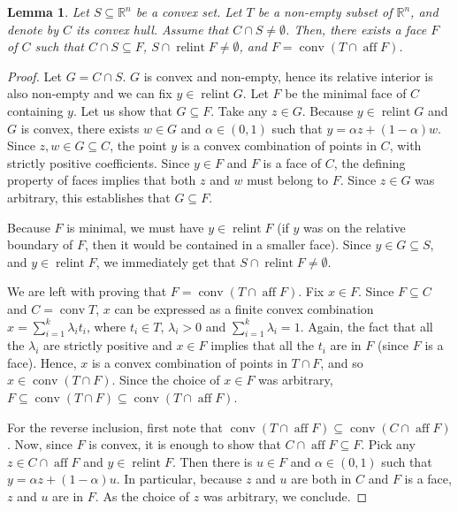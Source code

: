 \documentclass[10pt, a4paper]{article}
\newcommand{\R}{\mathbb R}
\DeclareMathOperator{\aff}{aff}
\DeclareMathOperator{\conv}{conv}
\DeclareMathOperator{\relint}{relint}
\newtheorem{lemma}{Lemma}
\begin{document}
\begin{lemma}\label{lemma:face}
    Let $S\subseteq\R^n$ be a  convex set. Let $T$ be a  non-empty subset of $\R^n$, and denote by $C$ its convex hull. Assume that $C\cap S\neq \emptyset$. Then, there exists a face $F$ of $C$ such that $C\cap S\subseteq F$, $S\cap \relint F \neq\emptyset$, and  $F = \conv(T\cap \aff F)$. 
\end{lemma}
\begin{proof}
    Let $G = C\cap S$. $G$ is convex and non-empty, hence its relative interior is also non-empty and we can fix $y\in\relint G$. Let $F$ be the minimal face of $C$ containing $y$. Let us show that $G\subseteq F$. Take any $z \in G$. Because $y \in \relint G$ and $G$ is convex, there exists $w \in G$ and $\alpha \in (0, 1)$ such that $y = \alpha z + (1-\alpha)w$. Since $z, w \in G \subseteq C$, the point $y$ is a convex combination of points in $C$, with strictly positive coefficients. Since $y \in F$ and $F$ is a face of $C$, the defining property of faces implies that both $z$ and $w$ must belong to $F$.  Since $z \in G$ was arbitrary, this establishes that $G \subseteq F$.
    
    Because $F$ is minimal, we must have $y\in\relint F$ (if $y$ was on the relative boundary of $F$, then it would be contained in a smaller face). Since $y\in G\subseteq S$, and $y\in\relint F$, we immediately get that $S\cap \relint F\neq \emptyset$. 

    We are left with proving that $F=\conv(T\cap \aff F)$. Fix $x\in F$. Since $F\subseteq C$ and $C = \conv T$, $x$ can be expressed as a finite convex combination $x = \sum_{i=1}^k\lambda_i t_i$, where $t_i\in T$, $\lambda_i>0$ and $\sum_{i=1}^k\lambda_i = 1$. Again, the fact that all the $\lambda_i$ are strictly positive and $x\in F$ implies that all the $t_i$ are in $F$ (since $F$ is a face). Hence, $x$ is a convex combination of points in $T\cap F$, and so $x\in\conv(T\cap F)$. Since the choice of $x\in F$ was arbitrary, $F \subseteq \conv(T\cap F)\subseteq \conv(T\cap\aff F)$. 
    
    For the reverse inclusion, first note that $\conv(T\cap\aff F)\subseteq\conv(C\cap\aff F)$. Now, since $F$ is convex, it is enough to show that $C\cap\aff F\subseteq F$. Pick any $z\in C\cap\aff F$ and $y\in\relint F$. Then there is $u\in F$ and $\alpha\in(0,1)$ such that $y = \alpha z + (1-\alpha)u$. In particular, because $z$ and $u$ are both in $C$ and $F$ is a face, $z$ and $u$ are in $F$. As the choice of $z$ was arbitrary, we conclude.
\end{proof}
\end{document}
